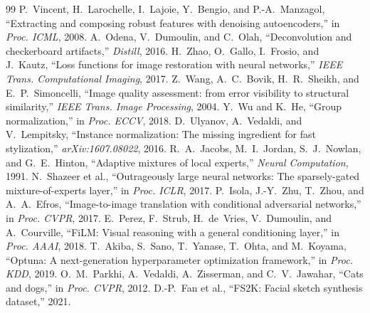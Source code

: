 \documentclass[conference]{IEEEtran}
\begin{document}
\begin{thebibliography}{99}
 P.~Vincent, H.~Larochelle, I.~Lajoie, Y.~Bengio, and P.-A.~Manzagol,
``Extracting and composing robust features with denoising autoencoders,'' in \emph{Proc. ICML}, 2008.
 A.~Odena, V.~Dumoulin, and C.~Olah, ``Deconvolution and checkerboard
artifacts,'' \emph{Distill}, 2016.
 H.~Zhao, O.~Gallo, I.~Frosio, and J.~Kautz, ``Loss functions for image restoration
with neural networks,'' \emph{IEEE Trans. Computational Imaging}, 2017.
 Z.~Wang, A.~C.~Bovik, H.~R.~Sheikh, and E.~P.~Simoncelli, ``Image quality assessment:
from error visibility to structural similarity,'' \emph{IEEE Trans. Image Processing}, 2004.
 Y.~Wu and K.~He, ``Group normalization,'' in \emph{Proc. ECCV}, 2018.
 D.~Ulyanov, A.~Vedaldi, and V.~Lempitsky, ``Instance normalization: The missing
ingredient for fast stylization,'' \emph{arXiv:1607.08022}, 2016.
 R.~A.~Jacobs, M.~I.~Jordan, S.~J.~Nowlan, and G.~E.~Hinton, ``Adaptive mixtures of
local experts,'' \emph{Neural Computation}, 1991.
 N.~Shazeer et al., ``Outrageously large neural networks: The sparsely-gated
mixture-of-experts layer,'' in \emph{Proc. ICLR}, 2017.
 P.~Isola, J.-Y.~Zhu, T.~Zhou, and A.~A.~Efros, ``Image-to-image translation with
conditional adversarial networks,'' in \emph{Proc. CVPR}, 2017.
 E.~Perez, F.~Strub, H.~de~Vries, V.~Dumoulin, and A.~Courville, ``FiLM: Visual
reasoning with a general conditioning layer,'' in \emph{Proc. AAAI}, 2018.
 T.~Akiba, S.~Sano, T.~Yanase, T.~Ohta, and M.~Koyama, ``Optuna: A next-generation
hyperparameter optimization framework,'' in \emph{Proc. KDD}, 2019.
 O.~M.~Parkhi, A.~Vedaldi, A.~Zisserman, and C.~V.~Jawahar, ``Cats and dogs,'' in
\emph{Proc. CVPR}, 2012.
 D.-P.~Fan et al., ``FS2K: Facial sketch synthesis dataset,'' 2021. \end{thebibliography}
\end{document}
